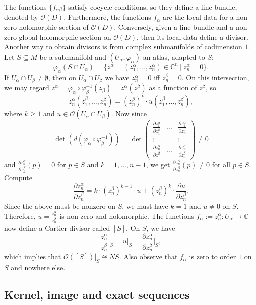 \documentclass[10pt, a4paper]{article}
\newcommand{\C}{\mathbb {C}}
\begin{document}
The functions $\{f_{\alpha \beta}\}$ satisfy cocycle conditions, so they define a line bundle, denoted by $\mathcal{O} (D)$.
Furthermore, the functions $f_\alpha$ are the local data for a non-zero holomorphic section of $\mathcal{O}(D)$.
Conversely, given a line bundle and a non-zero global holomorphic section on $\mathcal{O}(D)$,
then its local data define a divisor.
Another way to obtain divisors is from complex submanifolds of codimension $1$.
Let $S \subseteq M$ be a submanifold and $(U_\alpha, \varphi_\alpha)$
an atlas, adapted to $S$:
$$\varphi_\alpha (S \cap U_\alpha) = \{z^\alpha = (z_1 ^\alpha, \dots, z_n ^\alpha) \in \C^n\ |\ z_n ^\alpha = 0\}.$$
If $U_\alpha \cap U_\beta \neq \emptyset$, then on $U_\alpha \cap U_\beta$ we have $z_n ^\alpha = 0$ iff $z_n ^\beta = 0$.
On this intersection, we may regard $z^\alpha = \varphi_\alpha \circ \varphi_\beta ^{-1} (z_\beta) = z^\alpha (z^\beta)$ as a function of $z ^\beta$,
so 
$$z_n ^\alpha (z_1 ^\beta , \dots , z_n ^\beta) = (z_n ^\beta) ^k \cdot u(z_1 ^\beta, \dots, z_n ^\beta),$$
where $k \geq 1$ and $u \in \mathcal{O}(U_\alpha \cap U_\beta)$.
Now since $$\det (d(\varphi_\alpha \circ \varphi_\beta ^{-1})) = \det \begin{pmatrix}
  \frac{\partial z_1 ^\alpha}{\partial z_1 ^\beta} & \dots & \frac{\partial z_1 ^\alpha}{\partial z_n ^\beta}\\
  \vdots & & \vdots\\
  \frac{\partial z_n ^\alpha}{\partial z_1 ^\beta} & \dots & \frac{\partial z_n ^\alpha}{\partial z_n ^\beta}
\end{pmatrix} \neq 0$$
and $\frac{\partial z_n ^\alpha}{\partial z_k ^\beta} (p) = 0$ for $p \in S$ and $k = 1, \dots, n - 1$,
we get $\frac{\partial z_n ^\alpha}{\partial z_n ^\beta} (p) \neq 0$ for all $p \in S$.
Compute 
$$\frac{\partial z_n ^\alpha}{\partial z_n ^\beta} = k \cdot (z_n ^\beta)^{k - 1} \cdot u + (z_n ^\beta)^k \cdot \frac{\partial u}{\partial z_n ^\beta}.$$
Since the above must be nonzero on $S$, we must have $k = 1$ and $u \neq 0$ on $S$.
Therefore, $u = \frac{z_n ^\alpha}{z_n ^\beta}$ is non-zero and holomorphic. 
The functions $f_\alpha := z_n ^\alpha: U_\alpha \to \C$ now define a Cartier divisor called $[S]$.
On $S$, we have $$\frac{z_n ^\alpha}{z_n ^\beta}\big|_S = u \big|_S = \frac{\partial z_n ^\alpha}{\partial z_n ^\beta}\big|_S,$$
which implies that $\mathcal{O} ([S]) \big|_S \cong NS$.
Also observe that $f_\alpha$ is zero to order $1$ on $S$ and nowhere else. 

\subsection{Kernel, image and exact sequences}
\end{document}
